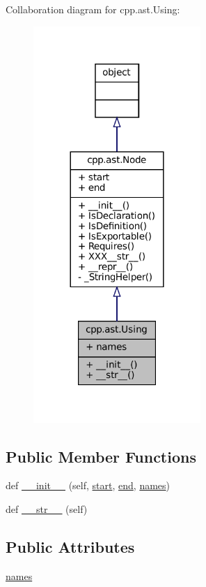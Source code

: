 Collaboration diagram for cpp.\+ast.\+Using\+:
\nopagebreak
\begin{figure}[H]
\begin{center}
\leavevmode
\includegraphics[width=180pt]{classcpp_1_1ast_1_1Using__coll__graph}
\end{center}
\end{figure}
\subsection*{Public Member Functions}
\begin{DoxyCompactItemize}
\item 
def \hyperlink{classcpp_1_1ast_1_1Using_a9b7a760a06d00f7211c889d9841e06af}{\+\_\+\+\_\+init\+\_\+\+\_\+} (self, \hyperlink{classcpp_1_1ast_1_1Node_a7b2aa97e6a049bb1a93aea48c48f1f44}{start}, \hyperlink{classcpp_1_1ast_1_1Node_a3c5e5246ccf619df28eca02e29d69647}{end}, \hyperlink{classcpp_1_1ast_1_1Using_abc05dedb59eb83857d373cc0e64eccb3}{names})
\item 
def \hyperlink{classcpp_1_1ast_1_1Using_ac209e8e5d84988d14a8f4b30377e5455}{\+\_\+\+\_\+str\+\_\+\+\_\+} (self)
\end{DoxyCompactItemize}
\subsection*{Public Attributes}
\begin{DoxyCompactItemize}
\item 
\hyperlink{classcpp_1_1ast_1_1Using_abc05dedb59eb83857d373cc0e64eccb3}{names}
\end{DoxyCompactItemize}


